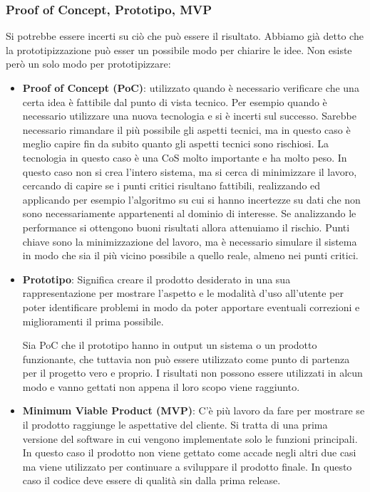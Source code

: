 \subsubsection{Proof of Concept, Prototipo, MVP}
Si potrebbe essere incerti su ciò che può essere il risultato. Abbiamo già detto che la prototipizzazione può esser un possibile modo per chiarire le idee. Non esiste però un solo modo per prototipizzare:
\begin{itemize}
	\item \textbf{Proof of Concept (PoC)}: utilizzato quando è necessario verificare che una certa idea è fattibile dal punto di vista tecnico. Per esempio quando è necessario utilizzare una nuova tecnologia e si è incerti sul successo. Sarebbe necessario rimandare il più possibile gli aspetti tecnici, ma in questo caso è meglio capire fin da subito quanto gli aspetti tecnici sono rischiosi. La tecnologia in questo caso è una CoS molto importante e ha molto peso. In questo caso non si crea l'intero sistema, ma si cerca di minimizzare il lavoro, cercando di capire se i punti critici risultano fattibili, realizzando ed applicando per esempio l'algoritmo su cui si hanno incertezze su dati che non sono necessariamente appartenenti al dominio di interesse. Se analizzando le performance si ottengono buoni risultati allora attenuiamo il rischio. Punti chiave sono la minimizzazione del lavoro, ma è necessario simulare il sistema in modo che sia il più vicino possibile a quello reale, almeno nei punti critici.
	\item \textbf{Prototipo}: Significa creare il prodotto desiderato in una sua rappresentazione per mostrare l'aspetto e le modalità d'uso all'utente per poter identificare problemi in modo da poter apportare eventuali correzioni e miglioramenti il prima possibile.
	\begin{warn}
		Sia PoC che il prototipo hanno in output un sistema o un prodotto funzionante, che tuttavia non può essere utilizzato come punto di partenza per il progetto vero e proprio. I risultati non possono essere utilizzati in alcun modo e vanno gettati non appena il loro scopo viene raggiunto.
	\end{warn}
	\item \textbf{Minimum Viable Product (MVP)}: C'è più lavoro da fare per mostrare se il prodotto raggiunge le aspettative del cliente. Si tratta di una prima versione del software in cui vengono implementate solo le funzioni principali. In questo caso il prodotto non viene gettato come accade negli altri due casi ma viene utilizzato per continuare a sviluppare il prodotto finale. In questo caso il codice deve essere di qualità sin dalla prima release.
\end{itemize}

